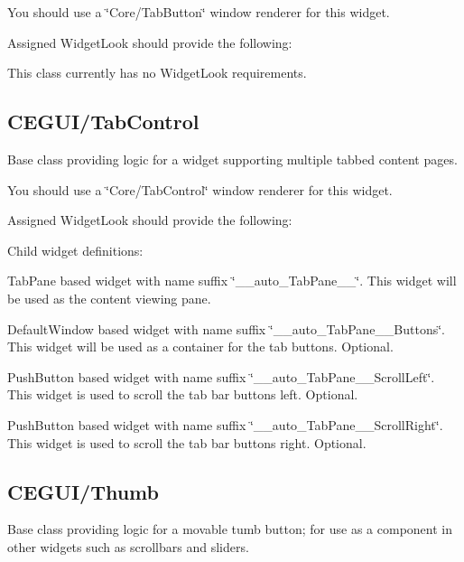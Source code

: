You should use a \char`\"{}\+Core/\+Tab\+Button\char`\"{} window renderer for this widget.

Assigned Widget\+Look should provide the following\+: 
\begin{DoxyItemize}
\item This class currently has no Widget\+Look requirements. 
\end{DoxyItemize}\hypertarget{fal_baseclass_ref_fal_baseclass_ref_sec_26}{}\subsection{C\+E\+G\+U\+I/\+Tab\+Control}\label{fal_baseclass_ref_fal_baseclass_ref_sec_26}
Base class providing logic for a widget supporting multiple tabbed content pages.

You should use a \char`\"{}\+Core/\+Tab\+Control\char`\"{} window renderer for this widget.

Assigned Widget\+Look should provide the following\+: 
\begin{DoxyItemize}
\item Child widget definitions\+: 
\begin{DoxyItemize}
\item Tab\+Pane based widget with name suffix \char`\"{}\+\_\+\+\_\+auto\+\_\+\+Tab\+Pane\+\_\+\+\_\+\char`\"{}. This widget will be used as the content viewing pane. 
\item Default\+Window based widget with name suffix \char`\"{}\+\_\+\+\_\+auto\+\_\+\+Tab\+Pane\+\_\+\+\_\+\+Buttons\char`\"{}. This widget will be used as a container for the tab buttons. Optional. 
\item Push\+Button based widget with name suffix \char`\"{}\+\_\+\+\_\+auto\+\_\+\+Tab\+Pane\+\_\+\+\_\+\+Scroll\+Left\char`\"{}. This widget is used to scroll the tab bar buttons left. Optional. 
\item Push\+Button based widget with name suffix \char`\"{}\+\_\+\+\_\+auto\+\_\+\+Tab\+Pane\+\_\+\+\_\+\+Scroll\+Right\char`\"{}. This widget is used to scroll the tab bar buttons right. Optional. 
\end{DoxyItemize}
\end{DoxyItemize}\hypertarget{fal_baseclass_ref_fal_baseclass_ref_sec_27}{}\subsection{C\+E\+G\+U\+I/\+Thumb}\label{fal_baseclass_ref_fal_baseclass_ref_sec_27}
Base class providing logic for a movable \textquotesingle{}tumb\textquotesingle{} button; for use as a component in other widgets such as scrollbars and sliders.

